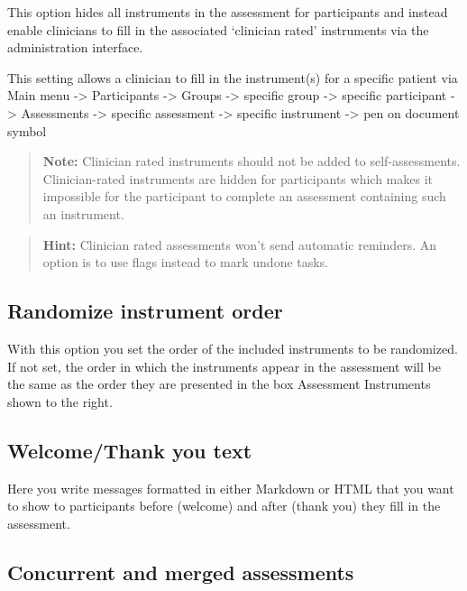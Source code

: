 \documentclass[
]{book}
\begin{document}
This option hides all instruments in the assessment for participants and instead enable clinicians to fill in the associated `clinician rated' instruments via the administration interface.

This setting allows a clinician to fill in the instrument(s) for a specific patient via Main menu -\textgreater{} Participants -\textgreater{} Groups -\textgreater{} specific group -\textgreater{} specific participant -\textgreater{} Assessments -\textgreater{} specific assessment -\textgreater{} specific instrument -\textgreater{} pen on document symbol

\begin{quote}
\textbf{Note:} Clinician rated instruments should not be added to self-assessments. Clinician-rated instruments are hidden for participants which makes it impossible for the participant to complete an assessment containing such an instrument.
\end{quote}

\begin{quote}
\textbf{Hint:} Clinician rated assessments won't send automatic reminders. An option is to use flags instead to mark undone tasks.
\end{quote}

\subsection{Randomize instrument order}\label{randomize-instrument-order}

With this option you set the order of the included instruments to be randomized. If not set, the order in which the instruments appear in the assessment will be the same as the order they are presented in the box Assessment Instruments shown to the right.

\subsection{Welcome/Thank you text}\label{welcomethank-you-text}

Here you write messages formatted in either Markdown or HTML that you want to show to participants before (welcome) and after (thank you) they fill in the assessment.

\subsection{Concurrent and merged assessments}\label{concurrent-and-merged-assessments}
\end{document}
